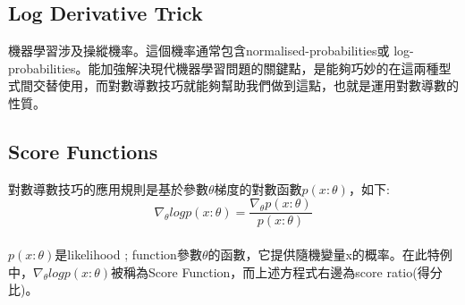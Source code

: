 \documentclass[14pt,a4paper]{report}  %
\begin{document}
\subsection{Log Derivative Trick}
\qquad 機器學習涉及操縱機率。這個機率通常包含normalised-probabilities或 log-probabilities。能加強解決現代機器學習問題的關鍵點，是能夠巧妙的在這兩種型式間交替使用，而對數導數技巧就能夠幫助我們做到這點，也就是運用對數導數的性質。\\
\subsection{Score Functions}
\qquad 對數導數技巧的應用規則是基於參數$\theta$梯度的對數函數$p(x:\theta)$，如下:\\
$$\nabla_\theta logp(x:\theta)=\frac{\nabla_\theta p(x:\theta)}{p(x:\theta)}$$\\
$p(x:\theta)$是likelihood ; function參數$\theta$的函數，它提供隨機變量x的概率。在此特例中，$\nabla_\theta logp(x:\theta)$被稱為Score Function，而上述方程式右邊為score ratio(得分比)。\\[6pt]
\end{document}
